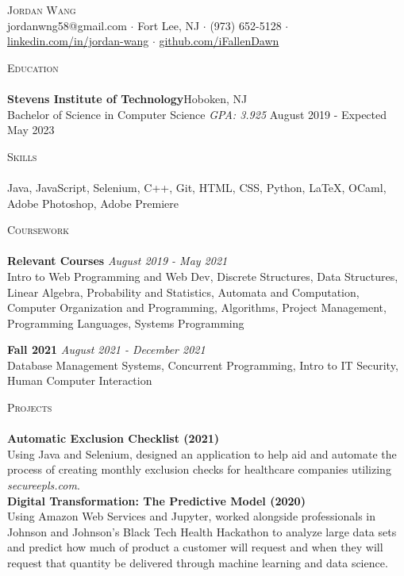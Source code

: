 \documentclass[10pt]{article}
\newcommand{\lineunder} {
    \vspace*{-8pt} \\
    \hspace*{-18pt} \hrulefill \\
}
\newcommand{\header} [1] {
    {\hspace*{-18pt}\vspace*{6pt} \textsc{#1}}
    \vspace*{-6pt} \lineunder
}
\begin{document}
\vspace*{-40pt}

    

\vspace*{2pt}
\begin{center}
	{\Huge \scshape {Jordan Wang}}\\
	jordanwng58@gmail.com $\cdot$ Fort Lee, NJ $\cdot$ (973) 652-5128 $\cdot$ \href{https://www.linkedin.com/in/jordan-wang/}{linkedin.com/in/jordan-wang} $\cdot$ \href{https://github.com/iFallenDawn}{github.com/iFallenDawn} \\
\end{center}

\header{Education}
\textbf{Stevens Institute of Technology}\hfill Hoboken, NJ\\
Bachelor of Science in Computer Science \textit{GPA: 3.925} \hfill August 2019 - Expected May 2023\\
\vspace{2mm}

\header{Skills}
	Java, JavaScript, Selenium, C++, Git, HTML, CSS, Python, \LaTeX, OCaml, Adobe Photoshop, Adobe Premiere                    \\
\vspace{2mm}

\header{Coursework}
{\textbf{Relevant Courses}} {\sl August 2019 - May 2021} \hfill 
\\
Intro to Web Programming and Web Dev, Discrete Structures, Data Structures, Linear Algebra, Probability and Statistics, Automata and Computation, Computer Organization and Programming, Algorithms, Project Management, Programming Languages, Systems Programming\\
\vspace*{2mm}

{\textbf{Fall 2021}} {\sl August 2021 - December 2021} \hfill 
\\
Database Management Systems, Concurrent Programming, Intro to IT Security, Human Computer Interaction\\
\vspace*{2mm}

\header{Projects}
{\textbf{Automatic Exclusion Checklist (2021)}} \hfill 
\\
Using Java and Selenium, designed an application to help aid and automate the process of creating monthly exclusion checks for healthcare companies utilizing \textit{secureepls.com}.\\
\vspace*{2mm}
{\textbf{Digital Transformation: The Predictive Model (2020)}} \hfill 
\\
Using Amazon Web Services and Jupyter, worked alongside professionals in Johnson and Johnson's Black Tech Health Hackathon to analyze large data sets and predict how much of product a customer will request and when they will request that quantity be delivered through machine learning and data science.\\
\vspace*{2mm}
\end{document}
